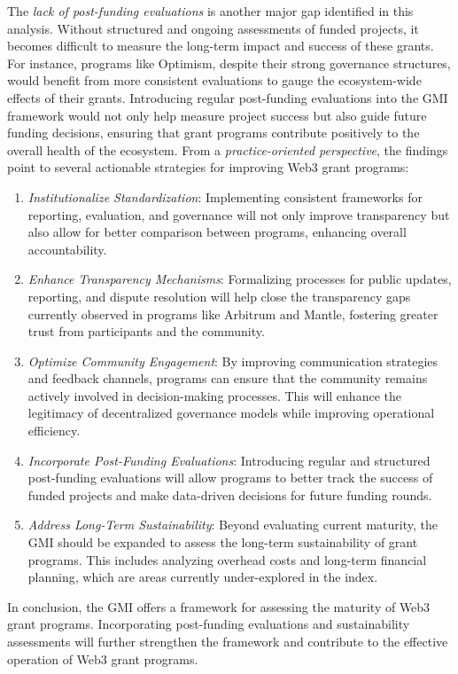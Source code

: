 \documentclass[a4,10pt]{article}
\begin{document}
The \textit{lack of post-funding evaluations} is another major gap identified in this analysis. Without structured and ongoing assessments of funded projects, it becomes difficult to measure the long-term impact and success of these grants. For instance, programs like Optimism, despite their strong governance structures, would benefit from more consistent evaluations to gauge the ecosystem-wide effects of their grants. Introducing regular post-funding evaluations into the GMI framework would not only help measure project success but also guide future funding decisions, ensuring that grant programs contribute positively to the overall health of the ecosystem. From a \textit{practice-oriented perspective}, the findings point to several actionable strategies for improving Web3 grant programs:

\begin{enumerate}
    \item \textit{Institutionalize Standardization}: Implementing consistent frameworks for reporting, evaluation, and governance will not only improve transparency but also allow for better comparison between programs, enhancing overall accountability.
    \item \textit{Enhance Transparency Mechanisms}: Formalizing processes for public updates, reporting, and dispute resolution will help close the transparency gaps currently observed in programs like Arbitrum and Mantle, fostering greater trust from participants and the community.
    \item \textit{Optimize Community Engagement}: By improving communication strategies and feedback channels, programs can ensure that the community remains actively involved in decision-making processes. This will enhance the legitimacy of decentralized governance models while improving operational efficiency.
    \item \textit{Incorporate Post-Funding Evaluations}: Introducing regular and structured post-funding evaluations will allow programs to better track the success of funded projects and make data-driven decisions for future funding rounds.
    \item \textit{Address Long-Term Sustainability}: Beyond evaluating current maturity, the GMI should be expanded to assess the long-term sustainability of grant programs. This includes analyzing overhead costs and long-term financial planning, which are areas currently under-explored in the index.
\end{enumerate}

In conclusion, the GMI offers a framework for assessing the maturity of Web3 grant programs. Incorporating post-funding evaluations and sustainability assessments will further strengthen the framework and contribute to the effective operation of Web3 grant programs.
\end{document}
